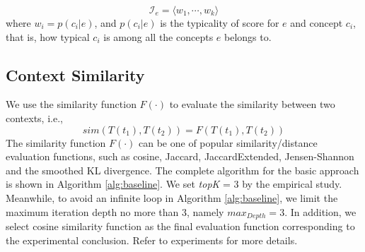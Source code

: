 \begin{equation}
\label{eq:Ie}
  \mathcal{I}_e = \langle w_1,\cdots,w_k\rangle
\end{equation}
where $w_i=p(c_i|e)$, and $p(c_i|e)$ is the
typicality of score for $e$ and concept $c_i$, that is, how typical
$c_i$ is among all the concepts $e$ belongs to.


\subsection{Context Similarity}
We use the similarity function $F(\cdot)$
to evaluate the similarity between two contexts, i.e.,
\begin{equation}
sim(T(t_{1}), T(t_{2})) = F(T(t_{1}), T(t_{2}))
\label{eq:F}
\end{equation}
The similarity function $F(\cdot)$ can be one of popular similarity/distance evaluation functions, such as cosine, Jaccard,
JaccardExtended, Jensen-Shannon and the smoothed KL divergence. 
The complete algorithm for the basic approach is shown
in Algorithm \ref{alg:baseline}.
We set \emph{topK} = 3 by the empirical study. Meanwhile, to avoid an infinite loop in Algorithm \ref{alg:baseline}, we limit the maximum iteration depth no more than 3, namely $max_{Depth} = 3$. In addition, we select cosine similarity function as the final evaluation function corresponding to the experimental conclusion. 
Refer to experiments for more details.

